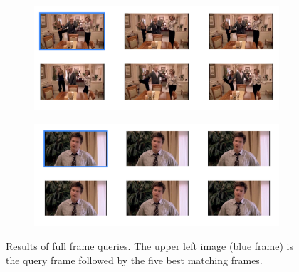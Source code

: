\documentclass{paper}
\begin{document}
\begin{figure}[h!]
    \centering
    \begin{subfigure}[]{\textwidth}
        \centering
        \includegraphics[width=\textwidth]{query1.png}
    \end{subfigure}
    \begin{subfigure}[]{\textwidth}
        \centering
        \includegraphics[width=\textwidth]{query6.png}
    \end{subfigure}
        \caption{Results of full frame queries. The upper left image (blue frame) is the query frame followed by the five best matching frames. }
\label{fig:fullfFame1}
\end{figure}
\end{document}

